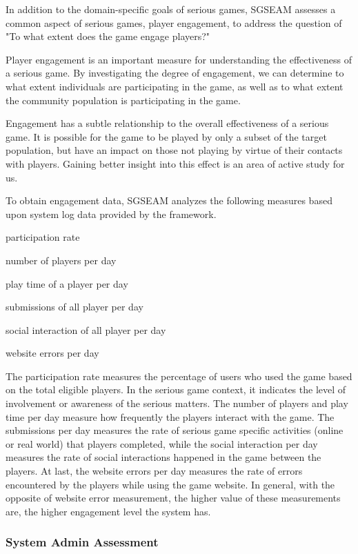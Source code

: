 \documentclass{sigchi}
\begin{document}
In addition to the domain-specific goals of serious games, SGSEAM assesses a common
aspect of serious games, player engagement, to address the question of "To what extent does the
game engage players?"

Player engagement is an important measure for understanding the effectiveness of a serious game.
By investigating the degree of engagement, we can determine to what extent individuals are
participating in the game, as well as to what extent the community population is participating in
the game.

Engagement has a subtle relationship to the overall effectiveness of a serious game. It is
possible for the game to be played by only a subset of the target population, but
have an impact on those not playing by virtue of their contacts with players. Gaining
better insight into this effect is an area of active study for us. 

To obtain engagement data, SGSEAM analyzes the following measures
based upon system log data provided by the framework.

\begin{compactitem}
\item participation rate
\item number of players per day
\item play time of a player per day
\item submissions of all player per day
\item social interaction of all player per day
\item website errors per day
\end{compactitem}

The participation rate measures the percentage of users who used the game based on the total
eligible players. In the serious game context, it indicates the level of involvement or awareness
of the serious matters. The number of players and play time per day measure how frequently the
players interact with the game. The submissions per day measures the rate of serious game
specific activities (online or real world) that players completed, while the social interaction
per day measures the rate of social interactions happened in the game between the players. At
last, the website errors per day measures the rate of errors encountered by the players while
using the game website. In general, with the opposite of website error measurement, the higher
value of these measurements are, the higher engagement level the system has.

\subsubsection{System Admin Assessment}
\end{document}
